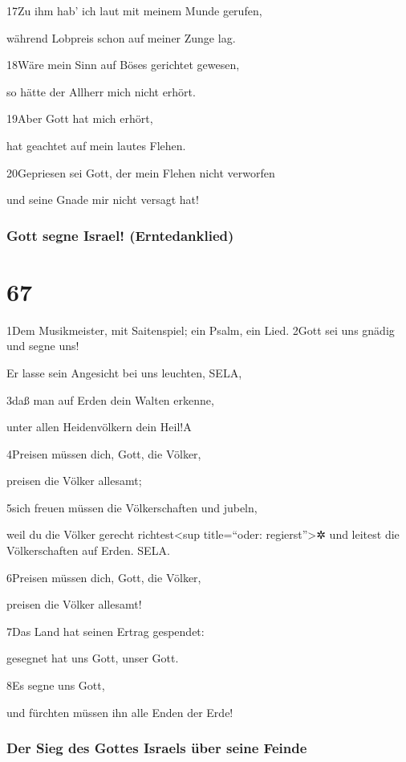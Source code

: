 17Zu ihm hab' ich laut mit meinem Munde gerufen,

während Lobpreis schon auf meiner Zunge lag.

18Wäre mein Sinn auf Böses gerichtet gewesen,

so hätte der Allherr mich nicht erhört.

19Aber Gott hat mich erhört,

hat geachtet auf mein lautes Flehen.

20Gepriesen sei Gott, der mein Flehen nicht verworfen

und seine Gnade mir nicht versagt hat!

\hypertarget{gott-segne-israel-erntedanklied}{%
\subsubsection{Gott segne Israel!
(Erntedanklied)}\label{gott-segne-israel-erntedanklied}}

\hypertarget{section-66}{%
\section{67}\label{section-66}}

1Dem Musikmeister, mit Saitenspiel; ein Psalm, ein Lied. 2Gott sei uns
gnädig und segne uns!

Er lasse sein Angesicht bei uns leuchten, SELA,

3daß man auf Erden dein Walten erkenne,

unter allen Heidenvölkern dein Heil!{A}

4Preisen müssen dich, Gott, die Völker,

preisen die Völker allesamt;

5sich freuen müssen die Völkerschaften und jubeln,

weil du die Völker gerecht richtest\textless sup title=``oder:
regierst''\textgreater✲ und leitest die Völkerschaften auf Erden. SELA.

6Preisen müssen dich, Gott, die Völker,

preisen die Völker allesamt!

7Das Land hat seinen Ertrag gespendet:

gesegnet hat uns Gott, unser Gott.

8Es segne uns Gott,

und fürchten müssen ihn alle Enden der Erde!

\hypertarget{der-sieg-des-gottes-israels-uxfcber-seine-feinde}{%
\subsubsection{Der Sieg des Gottes Israels über seine
Feinde}\label{der-sieg-des-gottes-israels-uxfcber-seine-feinde}}

